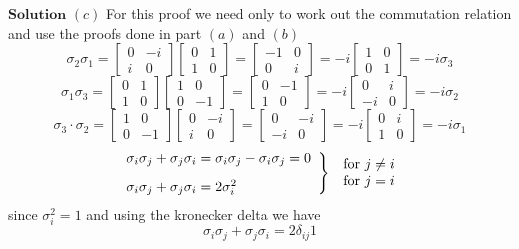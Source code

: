 \documentclass{styles/kaobook}
\begin{document}
$\boxed{\textbf{Solution}}$  $(c)$ For this proof we need only to work out the commutation relation and use the proofs done in part $(a)$ and $(b)$
$$\sigma_{2} \sigma_{1}=\begin{bmatrix}{0} & {-i} \\ {i} & {0}\end{bmatrix}\begin{bmatrix}{0} & {1} \\ {1} & {0}\end{bmatrix}=\begin{bmatrix}{-1} & {0} \\ {0} & {i}\end{bmatrix}=-i\begin{bmatrix}{1} & {0} \\ {0} & {1}\end{bmatrix} = -i\sigma_3$$
$$\sigma_{1} \sigma_{3}=\begin{bmatrix}{0} & {1} \\ {1} & {0}\end{bmatrix}\begin{bmatrix}{1} & {0} \\ {0} & {-1}\end{bmatrix}=\begin{bmatrix}{0} & {-1} \\ {1} & {0}\end{bmatrix}=-i\begin{bmatrix}{0} & {i} \\ {-i} & {0}\end{bmatrix}=-i \sigma_{2}$$
$$\sigma_{3} \cdot \sigma_{2}=\begin{bmatrix}{1} & {0} \\ {0} & {-1}\end{bmatrix}\begin{bmatrix}{0} & {-i} \\ {i} & {0}\end{bmatrix}=\begin{bmatrix}{0} & {-i} \\ {-i} & {0}\end{bmatrix}=-i\begin{bmatrix}{0} & {i} \\ {1} & {0}\end{bmatrix} = -i\sigma_1$$
$$\left.\begin{array}{l}{\sigma_{i} \sigma_{j}+\sigma_{j} \sigma_{i}=\sigma_{i} \sigma_{j}-\sigma_{i} \sigma_{j}=0} \vspace{3mm} \\ {\sigma_{i} \sigma_{j}+\sigma_{j} \sigma_{i}=2 \sigma_{i}^{2}}\end{array}\right\} \begin{array}{l}{\text { for } j \neq i} \\ {\text { for } j=i}\end{array}$$
since $\sigma_{i}^{2}=1$ and using the kronecker delta we have
$$\sigma_{i} \sigma_{j}+\sigma_{j} \sigma_{i}=2 \delta_{i j} 1$$
\end{document}
